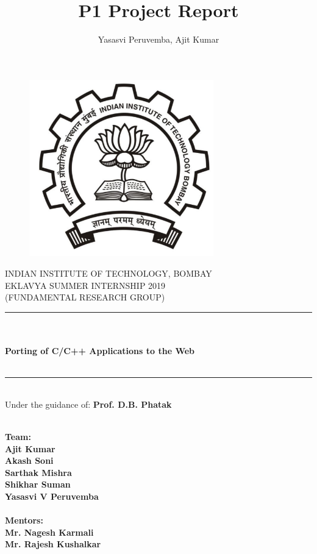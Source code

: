 \documentclass[12pt]{article}
\title{P1 Project Report}
\author{Yasasvi Peruvemba, Ajit Kumar}
\begin{document}
\begin{titlepage}
 \begin{center}
 \begin{figure}[h]
 \centering
 \includegraphics[width=8cm]{./iitb-black.pdf}
\end{figure}

INDIAN INSTITUTE OF TECHNOLOGY, BOMBAY\\
EKLAVYA SUMMER INTERNSHIP 2019\\
(FUNDAMENTAL RESEARCH GROUP) 
\noindent\rule{15cm}{0.4pt}\\
\textbf{\huge \\Porting of C/C++ Applications to the Web}\\
\textbf{}\\
\noindent\rule{15cm}{0.4pt}
\newline
\\Under the guidance of: \textbf{Prof. D.B. Phatak}
\begin{multicols}{2}
\textbf{\\ \large
\textbf{Team:} \\
\textbf{Ajit Kumar}\\
\textbf{Akash Soni}\\
\textbf{Sarthak Mishra}\\
\textbf{Shikhar Suman}\\
\textbf{Yasasvi V Peruvemba}\\
}
\columnbreak
\textbf{\\ \large
\textbf{Mentors:}\\
\textbf{Mr. Nagesh Karmali}\\
\textbf{Mr. Rajesh Kushalkar}
}
\end{multicols}

\end{center}
\end{titlepage}
\end{document}
